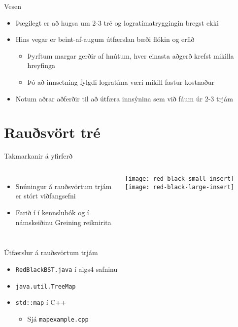 \documentclass{beamer}
\begin{document}
\begin{frame}{Vesen}
	\begin{itemize}
		\item Þægilegt er að hugsa um 2-3 tré og logratímatryggingin bregst ekki
		\item Hins vegar er beint-af-augum útfærslan bæði flókin og erfið
		      \begin{itemize}
			      \item Þyrftum margar gerðir af hnútum, hver einasta aðgerð krefst mikilla hreyfinga
			      \item Þó að innsetning fylgdi logratíma væri mikill fastur kostnaður
		      \end{itemize}
		\item Notum aðrar aðferðir til að útfæra innsýnina sem við fáum úr 2-3 trjám
	\end{itemize}
\end{frame}

\section{Rauðsvört tré}






\begin{frame}{Takmarkanir á yfirferð}
	\begin{columns}
		\begin{itemize}
			\item Snúningur á rauðsvörtum trjám er stórt viðfangsefni
			\item Farið í í kennslubók og í námskeiðinu Greining reiknirita
		\end{itemize}
		\texttt{[image: red-black-small-insert]}
		\texttt{[image: red-black-large-insert]}
	\end{columns}
\end{frame}


\begin{frame}{Útfærslur á rauðsvörtum trjám}
	\begin{itemize}
		\item \texttt{RedBlackBST.java} í algs4 safninu
		\item \texttt{java.util.TreeMap}
		\item \texttt{std::map} í C++
		      \begin{itemize}
			      \item Sjá \texttt{mapexample.cpp}
		      \end{itemize}
	\end{itemize}
\end{frame}
\end{document}
